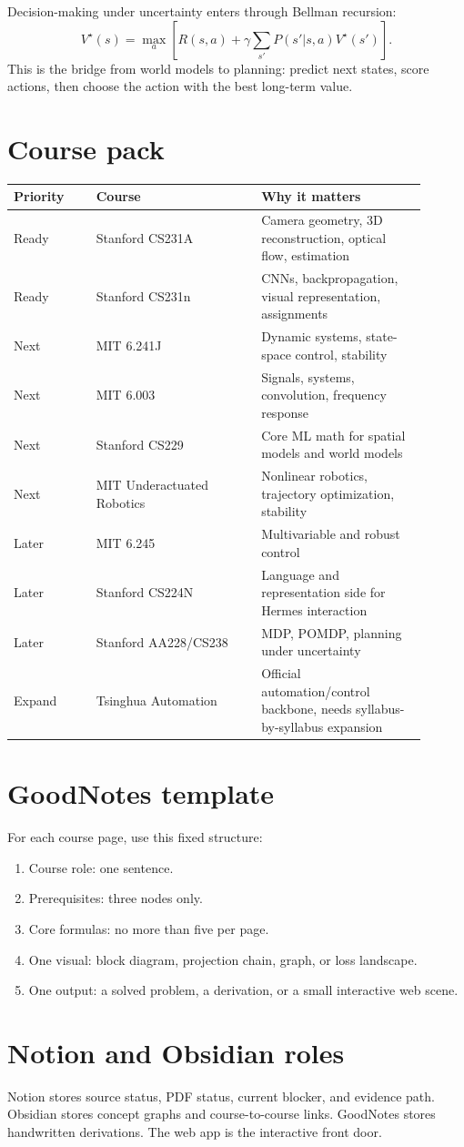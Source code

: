 \documentclass[11pt]{article}
\begin{document}
Decision-making under uncertainty enters through Bellman recursion:
\[
  V^\star(s)=\max_a \left[
    R(s,a)+\gamma\sum_{s'}P(s'|s,a)V^\star(s')
  \right].
\]
This is the bridge from world models to planning: predict next states, score actions, then choose the action with the best long-term value.

\section*{Course pack}
\begin{tabular}{p{0.18\linewidth}p{0.36\linewidth}p{0.36\linewidth}}
\toprule
Priority & Course & Why it matters \\
\midrule
Ready & Stanford CS231A & Camera geometry, 3D reconstruction, optical flow, estimation \\
Ready & Stanford CS231n & CNNs, backpropagation, visual representation, assignments \\
Next & MIT 6.241J & Dynamic systems, state-space control, stability \\
Next & MIT 6.003 & Signals, systems, convolution, frequency response \\
Next & Stanford CS229 & Core ML math for spatial models and world models \\
Next & MIT Underactuated Robotics & Nonlinear robotics, trajectory optimization, stability \\
Later & MIT 6.245 & Multivariable and robust control \\
Later & Stanford CS224N & Language and representation side for Hermes interaction \\
Later & Stanford AA228/CS238 & MDP, POMDP, planning under uncertainty \\
Expand & Tsinghua Automation & Official automation/control backbone, needs syllabus-by-syllabus expansion \\
\bottomrule
\end{tabular}

\section*{GoodNotes template}
For each course page, use this fixed structure:
\begin{enumerate}[leftmargin=1.4em]
  \item Course role: one sentence.
  \item Prerequisites: three nodes only.
  \item Core formulas: no more than five per page.
  \item One visual: block diagram, projection chain, graph, or loss landscape.
  \item One output: a solved problem, a derivation, or a small interactive web scene.
\end{enumerate}

\section*{Notion and Obsidian roles}
Notion stores source status, PDF status, current blocker, and evidence path. Obsidian stores concept graphs and course-to-course links. GoodNotes stores handwritten derivations. The web app is the interactive front door.
\end{document}
